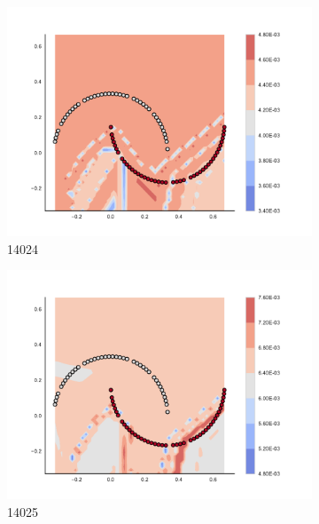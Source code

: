 \begin{figure}[h]
\begin{subfigure}[b]{0.09\textwidth}
    \includegraphics[clip, trim=2.35cm 1.75cm 4.5cm 0cm,width=\textwidth]{img/convergence/14024.pdf}
    \caption{14024}
    \label{fig:convergence_14024}
\end{subfigure}
%
\begin{subfigure}[b]{0.09\textwidth}
    \includegraphics[clip, trim=2.35cm 1.75cm 4.5cm 0cm,width=\textwidth]{img/convergence/14025.pdf}
    \caption{14025}
    \label{fig:convergence_14025}
\end{subfigure}
%
\begin{subfigure}[b]{0.09\textwidth}

\end{subfigure}
\end{figure}
